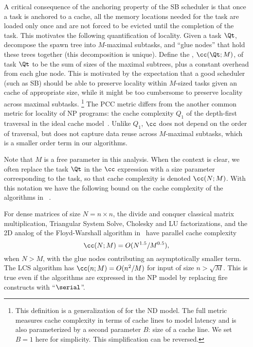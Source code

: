 A critical consequence of the anchoring property of the SB scheduler
is that once a task is anchored to a cache, all the memory locations
needed for the task are loaded only once and are not forced to be
evicted until the completion of the task. This motivates the following
quantification of locality.  Given a task $\Qt$, decompose the spawn
tree into $M$-maximal subtasks, and ``glue nodes'' that hold these
trees together (this decomposition is unique).  Define the
, $\cc(\Qt;M)$, of task $\Qt$ 
to be the sum of sizes of the maximal subtrees, plus a constant
overhead from each glue node. This is motivated by the expectation
that a good scheduler (such as SB) should be able to preserve locality
within $M$-sized tasks given an cache of appropriate size, while it
might be too cumbersome to preserve locality across maximal
subtasks. \footnote{This definition is a generalization
of \cite[Defn.2]{BlellochFiGi11} for the ND model.  The full metric
measures cache complexity in terms of cache lines to model latency and
is also parameterized by a second parameter $B$: size of a cache
line. We set $B=1$ here for simplicity.  This simplification can be
reversed.}  The PCC metric differs from the another common metric for
locality of NP programs: the cache complexity $Q_1$ of the depth-first
traversal in the ideal cache model~\cite{AcarBlBl00}. Unlike $Q_1$,
$\cc$ does not depend on the order of traversal, but does not capture
data reuse across $M$-maximal subtasks, which is a smaller order term
in our algorithms.

Note that $M$ is a free parameter in this analysis. When the context
is clear, we often replace the task $\Qt$ in the $\cc$ expression with
a size parameter corresponding to the task, so that cache complexity
is denoted $\cc(N;M)$. With this notation we have the following bound
on the cache complexity of the algorithms in ~.

\begin{claim}
For dense matrices of size $N = n\times n$, the divide and conquer
classical matrix multiplication, Triangular System Solve, Cholesky
and LU factorizations, and the 2D analog of the Floyd-Warshall algorithm
in~ have parallel cache complexity 
\[\cc(N;M) = O( N^{1.5}/M^{0.5}),\]
when $N>M$, with the glue nodes contributing an asymptotically
smaller term. The LCS algorithm has $\cc(n;M) = O(n^{2}/M)$ for input
of size $n>\sqrt{M}$. This is true even if the algorithms are
expressed in the NP model by replacing fire constructs with ``$\serial$''.
\label{clm:pcc-algos}
\end{claim}

